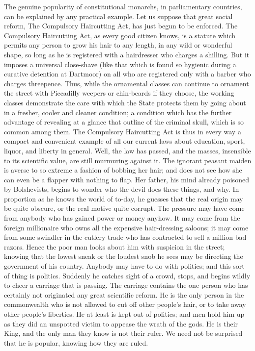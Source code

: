 \documentclass{book}
\begin{document}
The genuine popularity of constitutional monarchs, in parliamentary countries, can be explained by any practical example. Let us suppose that great social reform, The Compulsory Haircutting Act, has just begun to be enforced. The Compulsory Haircutting Act, as every good citizen knows, is a statute which permits any person to grow his hair to any length, in any wild or wonderful shape, so long as he is registered with a hairdresser who charges a shilling. But it imposes a universal close-shave (like that which is found so hygienic during a curative detention at Dartmoor) on all who are registered only with a barber who charges threepence. Thus, while the ornamental classes can continue to ornament the street with Piccadilly weepers or chin-beards if they choose, the working classes demonstrate the care with which the State protects them by going about in a fresher, cooler and cleaner condition; a condition which has the further advantage of revealing at a glance that outline of the criminal skull, which is so common among them. The Compulsory Haircutting Act is thus in every way a compact and convenient example of all our current laws about education, sport, liquor, and liberty in general. Well, the law has passed, and the masses, insensible to its scientific value, are still murmuring against it. The ignorant peasant maiden is averse to so extreme a fashion of bobbing her hair; and does not see how she can even be a flapper with nothing to flap. Her father, his mind already poisoned by Bolshevists, begins to wonder who the devil does these things, and why. In proportion as he knows the world of to-day, he guesses that the real origin may be quite obscure, or the real motive quite corrupt. The pressure may have come from anybody who has gained power or money anyhow. It may come from the foreign millionaire who owns all the expensive hair-dressing saloons; it may come from some swindler in the cutlery trade who has contracted to sell a million bad razors. Hence the poor man looks about him with suspicion in the street; knowing that the lowest sneak or the loudest snob he sees may be directing the government of his country. Anybody may have to do with politics; and this sort of thing is politics. Suddenly he catches sight of a crowd, stops, and begins wildly to cheer a carriage that is passing. The carriage contains the one person who has certainly not originated any great scientific reform. He is the only person in the commonwealth who is not allowed to cut off other people’s hair, or to take away other people’s liberties. He at least is kept out of politics; and men hold him up as they did an unspotted victim to appease the wrath of the gods. He is their King, and the only man they know is not their ruler. We need not be surprised that he is popular, knowing how they are ruled.
\end{document}
